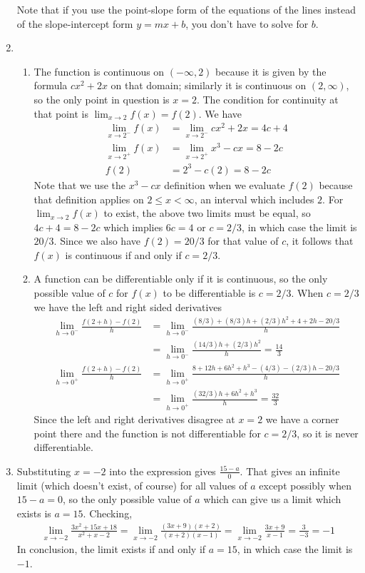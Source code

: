 \documentclass{article}
\newcommand{\ds}{\displaystyle}
\begin{document}
\begin{enumerate}
  Note that if you use the point-slope form of the equations of the lines
  instead of the slope-intercept form $y=mx+b$, you don't have to solve 
  for $b$.
\item 
  \begin{enumerate}
  \item The function is continuous on $(-\infty,2)$ because it is given by
    the formula $cx^2+2x$ on that domain; similarly it is continuous on 
    $(2,\infty)$, so the only point in question is $x=2$.  The condition for
    continuity at that point is $\ds \lim_{x\to 2} f(x) = f(2)$.  We have
    \begin{align*}
      \lim_{x\to 2^-} f(x) &= \lim_{x\to 2^-} cx^2 + 2x = 4c+4 \\
      \lim_{x\to 2^+} f(x) &= \lim_{x\to 2^+} x^3 - cx = 8-2c \\
      f(2) &= 2^3-c(2) = 8-2c
    \end{align*}
    Note that we use the $x^3-cx$ definition when we evaluate $f(2)$ 
    because that definition applies on $2\le x < \infty$, an interval which
    includes $2$.
    For $\lim_{x\to 2} f(x)$ to exist, the above two limits must be equal, so
    $4c+4=8-2c$ which implies $6c=4$ or $c=2/3$, in which case the limit
    is $20/3$.  Since we also have $f(2)=20/3$ for that value of $c$, it follows
    that $f(x)$ is continuous if and only if $c=2/3$.
  \item A function can be differentiable only if it is continuous, so the
    only possible value of $c$ for $f(x)$ to be differentiable is $c=2/3$.
    When $c=2/3$ we have the left and right sided derivatives
    \begin{align*}
      \lim_{h\to 0^-} \frac{f(2+h)-f(2)}{h}
      &= \lim_{h\to 0^-} \frac{(8/3)+(8/3)h+(2/3)h^2+4+2h-20/3}{h}
      \\
      &= \lim_{h\to 0^-} \frac{(14/3)h + (2/3)h^2}{h} = \frac{14}{3}
      \\
      \lim_{h\to 0^+} \frac{f(2+h)-f(2)}{h}
      &= \lim_{h\to 0^+} \frac{8+12h+6h^2+h^3-(4/3)-(2/3)h-20/3}{h}
      \\
      &= \lim_{h\to 0^+} \frac{(32/3)h + 6h^2+h^3}{h} = \frac{32}{3}
    \end{align*}
    Since the left and right derivatives disagree at $x=2$ we have a corner
    point there and the function is not differentiable for $c=2/3$, so it
    is never differentiable.
  \end{enumerate}
\item Substituting $x=-2$ into the expression gives $\ds \frac{15-a}{0}$.
  That gives an infinite limit (which doesn't exist, of course) for all values
  of $a$ except possibly when $15-a=0$, 
  so the only possible value of $a$ which can give us a limit which exists
  is $a=15$.  Checking,
  \begin{align*}
    \lim_{x\to -2} \frac{3x^2+15x+18}{x^2+x-2}
    = \lim_{x\to -2} \frac{(3x+9)(x+2)}{(x+2)(x-1)}
    = \lim_{x\to -2} \frac{3x+9}{x-1}
    = \frac{3}{-3} = -1
  \end{align*}
  In conclusion, the limit exists if and only if $a=15$, in which case the
  limit is $-1$.
\end{enumerate}
\end{document}

